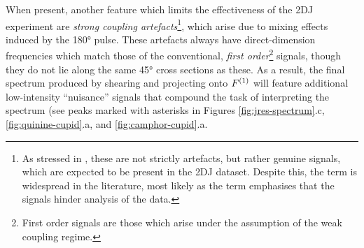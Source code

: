 When present, another feature which limits the effectiveness of the \ac{2DJ}
experiment are \emph{strong coupling artefacts}\footnote{
    As stressed in \cite{Thrippleton2005}, these are not strictly artefacts,
    but rather genuine signals, which are expected to be present in the
    \ac{2DJ} dataset. Despite this, the term is widespread in the literature,
    most likely as the term emphasises that the signals hinder analysis of the data.
}, which arise due to mixing effects induced by the \ang{180}
pulse\cite{Wider1983,Thrippleton2005}.
These artefacts always have direct-dimension
frequencies which match those of the conventional, \emph{first order}\footnote{
    First order signals are those which arise under the assumption of the weak
    coupling regime\cite[Section 2.5.2]{Cavanagh2007}.
} signals, though they do not lie along the same \ang{45} cross sections as
these. As a result, the final spectrum produced by shearing and projecting onto
$F^{(1)}$ will feature additional low-intensity ``nuisance'' signals that
compound the task of interpreting the spectrum (see peaks marked with asterisks
in Figures \ref{fig:jres-spectrum}.c, \ref{fig:quinine-cupid}.a, and
\ref{fig:camphor-cupid}.a.

